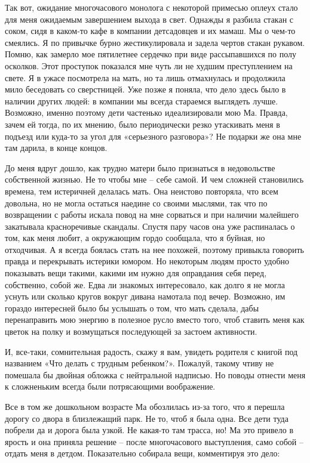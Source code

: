 \documentclass[
]{book}
\begin{document}
Так вот, ожидание многочасового монолога с некоторой примесью оплеух стало для меня ожидаемым завершением выхода в свет. Однажды я разбила стакан с соком, сидя в каком-то кафе в компании детсадовцев и их мамаш. Мы о чем-то смеялись. Я по привычке бурно жестикулировала и задела чертов стакан рукавом. Помню, как замерло мое пятилетнее сердечко при виде рассыпавшихся по полу осколков. Этот проступок показался мне чуть ли не худшим преступлением на свете. Я в ужасе посмотрела на мать, но та лишь отмахнулась и продолжила мило беседовать со сверстницей. Уже позже я поняла, что дело здесь было в наличии других людей: в компании мы всегда стараемся выглядеть лучше. Возможно, именно поэтому дети частенько идеализировали мою Ма. Правда, зачем ей тогда, по их мнению, было периодически резко утаскивать меня в подъезд или куда-то за угол для «серьезного разговора»? Не подарки же она мне там дарила, в конце концов.

До меня вдруг дошло, как трудно матери было признаться в недовольстве собственной жизнью. Не то чтобы мне -- себе самой. И чем сложней становились времена, тем истеричней делалась мать. Она неистово повторяла, что всем довольна, но не могла остаться наедине со своими мыслями, так что по возвращении с работы искала повод на мне сорваться и при наличии малейшего закатывала красноречивые скандалы. Спустя пару часов она уже распиналась о том, как меня любит, а окружающим гордо сообщала, что я буйная, но отходчивая. А я всегда боялась стать на нее похожей, поэтому привыкла говорить правда и перекрывать истерики юмором. Но некоторым людям просто удобно показывать вещи такими, какими им нужно для оправдания себя перед, собственно, собой же. Едва ли знакомых интересовало, как долго я не могла уснуть или сколько кругов вокруг дивана намотала под вечер. Возможно, им гораздо интересней было бы услышать о том, что мать сделала, дабы перенаправить мою энергию в полезное русло вместо того, чтоб ставить меня как цветок на полку и возмущаться последующей за застоем активности.

И, все-таки, сомнительная радость, скажу я вам, увидеть родителя с книгой под названием «Что делать с трудным ребенком?». Пожалуй, такому чтиву не помешала бы двойная обложка с нейтральной надписью. Но поводы отнести меня к сложненьким всегда были потрясающими воображение.

Все в том же дошкольном возрасте Ма обозлилась из-за того, что я перешла дорогу со двора в близлежащий парк. Не то, чтоб я была одна. Все дети туда побрели да и дорога была узкой. Не какая-то там трасса, но! Ма это привело в ярость и она приняла решение -- после многочасового выступления, само собой -- отдать меня в детдом. Показательно собирала вещи, комментируя это дело:
\end{document}
